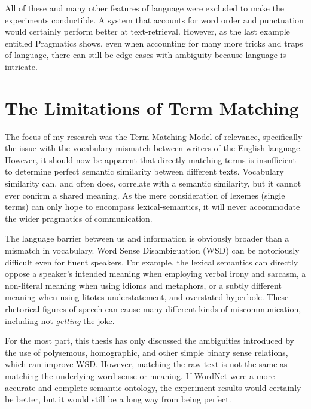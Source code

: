All of these and many other features of language were excluded to make the experiments conductible. A system that accounts for word order and punctuation would certainly perform better at text-retrieval. However, as the last example entitled Pragmatics shows, even when accounting for many more tricks and traps of language, there can still be edge cases with ambiguity because language is intricate.

\section{The Limitations of Term Matching}

The focus of my research was the Term Matching Model of relevance, specifically the issue with the vocabulary mismatch between writers of the English language. However, it should now be apparent that directly matching terms is insufficient to determine perfect semantic similarity between different texts. Vocabulary similarity can, and often does, correlate with a semantic similarity, but it cannot ever confirm a shared meaning. As the mere consideration of lexemes (single terms) can only hope to encompass lexical-semantics, it will never accommodate the wider pragmatics of communication.

The language barrier between us and information is obviously broader than a mismatch in vocabulary. Word Sense Disambiguation (WSD) can be notoriously difficult even for fluent speakers. For example, the lexical semantics can directly oppose a speaker's intended meaning when employing verbal irony and sarcasm, a non-literal meaning when using idioms and metaphors, or a subtly different meaning when using litotes understatement, and overstated hyperbole. These rhetorical figures of speech can cause many different kinds of miscommunication, including not \textit{getting} the joke.

For the most part, this thesis has only discussed the ambiguities introduced by the use of polysemous, homographic, and other simple binary sense relations, which can improve WSD. However, matching the raw text is not the same as matching the underlying word sense or meaning. If WordNet were a more accurate and complete semantic ontology, the experiment results would certainly be better, but it would still be a long way from being perfect.




